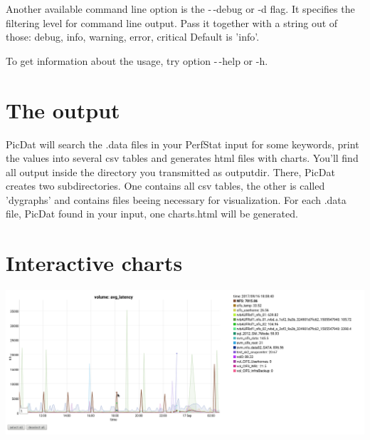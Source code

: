 \documentclass[8pt]{extarticle}
\begin{document}
Another available command line option is the -\,-debug or -d flag. It specifies the filtering level for command line output. Pass it together with a string out of those: debug, info, warning, error, critical
Default is 'info'.

To get information about the usage, try option -\,-help or -h.
\bigskip

\section*{The output}
PicDat will search the .data files in your PerfStat input for some keywords, print the values into several csv tables and generates html files with charts. You'll find all output inside the directory you transmitted as outputdir. There, PicDat creates two subdirectories. One contains all csv tables, the other is called 'dygraphs' and contains files beeing necessary for visualization. For each .data file, PicDat found in your input, one charts.html will be generated.

\section*{Interactive charts}
\includegraphics[scale=0.3]{PicDat_hightlight2}
\end{document}
